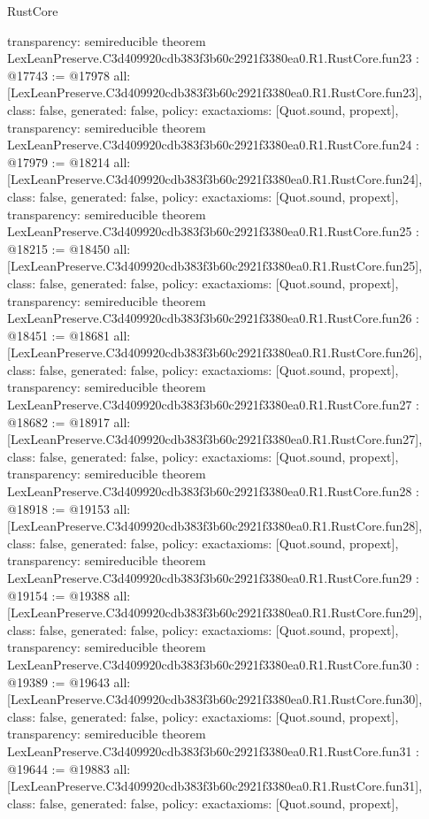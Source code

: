 \begin{lexlean}{RustCore}
\begin{coremodule}
{  transparency: semireducible
}
theorem LexLeanPreserve.C3d409920cdb383f3b60c2921f3380ea0.R1.RustCore.fun23 : @17743 := @17978 {
  all: [LexLeanPreserve.C3d409920cdb383f3b60c2921f3380ea0.R1.RustCore.fun23],
  class: false,
  generated: false,
  policy: exact{axioms: [Quot.sound, propext]},
  transparency: semireducible
}
theorem LexLeanPreserve.C3d409920cdb383f3b60c2921f3380ea0.R1.RustCore.fun24 : @17979 := @18214 {
  all: [LexLeanPreserve.C3d409920cdb383f3b60c2921f3380ea0.R1.RustCore.fun24],
  class: false,
  generated: false,
  policy: exact{axioms: [Quot.sound, propext]},
  transparency: semireducible
}
theorem LexLeanPreserve.C3d409920cdb383f3b60c2921f3380ea0.R1.RustCore.fun25 : @18215 := @18450 {
  all: [LexLeanPreserve.C3d409920cdb383f3b60c2921f3380ea0.R1.RustCore.fun25],
  class: false,
  generated: false,
  policy: exact{axioms: [Quot.sound, propext]},
  transparency: semireducible
}
theorem LexLeanPreserve.C3d409920cdb383f3b60c2921f3380ea0.R1.RustCore.fun26 : @18451 := @18681 {
  all: [LexLeanPreserve.C3d409920cdb383f3b60c2921f3380ea0.R1.RustCore.fun26],
  class: false,
  generated: false,
  policy: exact{axioms: [Quot.sound, propext]},
  transparency: semireducible
}
theorem LexLeanPreserve.C3d409920cdb383f3b60c2921f3380ea0.R1.RustCore.fun27 : @18682 := @18917 {
  all: [LexLeanPreserve.C3d409920cdb383f3b60c2921f3380ea0.R1.RustCore.fun27],
  class: false,
  generated: false,
  policy: exact{axioms: [Quot.sound, propext]},
  transparency: semireducible
}
theorem LexLeanPreserve.C3d409920cdb383f3b60c2921f3380ea0.R1.RustCore.fun28 : @18918 := @19153 {
  all: [LexLeanPreserve.C3d409920cdb383f3b60c2921f3380ea0.R1.RustCore.fun28],
  class: false,
  generated: false,
  policy: exact{axioms: [Quot.sound, propext]},
  transparency: semireducible
}
theorem LexLeanPreserve.C3d409920cdb383f3b60c2921f3380ea0.R1.RustCore.fun29 : @19154 := @19388 {
  all: [LexLeanPreserve.C3d409920cdb383f3b60c2921f3380ea0.R1.RustCore.fun29],
  class: false,
  generated: false,
  policy: exact{axioms: [Quot.sound, propext]},
  transparency: semireducible
}
theorem LexLeanPreserve.C3d409920cdb383f3b60c2921f3380ea0.R1.RustCore.fun30 : @19389 := @19643 {
  all: [LexLeanPreserve.C3d409920cdb383f3b60c2921f3380ea0.R1.RustCore.fun30],
  class: false,
  generated: false,
  policy: exact{axioms: [Quot.sound, propext]},
  transparency: semireducible
}
theorem LexLeanPreserve.C3d409920cdb383f3b60c2921f3380ea0.R1.RustCore.fun31 : @19644 := @19883 {
  all: [LexLeanPreserve.C3d409920cdb383f3b60c2921f3380ea0.R1.RustCore.fun31],
  class: false,
  generated: false,
  policy: exact{axioms: [Quot.sound, propext]},
}
\end{coremodule}
\end{lexlean}

